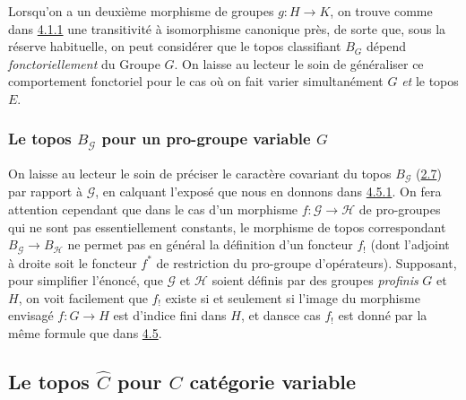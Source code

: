 \documentclass[10pt]{../fichiers-configuration-latex/smfart}
\begin{document}
Lorsqu'on a un deuxième morphisme de groupes $g:H\rightarrow K$,
on trouve comme dans \hyperref[IV.subsubsec4.1.1]{4.1.1} une transitivité à
isomorphisme canonique près, de sorte que, sous la réserve
habituelle, on peut considérer que le topos classifiant $B_G$
dépend \emph{fonctoriellement} du Groupe $G$. On laisse au lecteur
le soin de généraliser ce comportement fonctoriel pour le cas où
on fait varier simultanément $G$ \emph{et} le topos $E$.

\subsubsection{Le topos $B_{𝒢}$ pour un pro-groupe variable
  $G$}

On laisse au lecteur le soin de préciser le caractère covariant
du topos $B_{𝒢}$ (\hyperref[IV.subsec2.7]{2.7}) par rapport à
$𝒢$, en calquant l'exposé que nous en donnons dans
\hyperref[IV.subsubsec4.5.1]{4.5.1}. On fera attention cependant que dans le cas
d'un morphisme $f:𝒢\rightarrow ℋ$ de pro-groupes qui
ne sont pas essentiellement constants, le morphisme de topos
correspondant $B_{𝒢}\rightarrow B_{ℋ}$ ne permet pas
en général la définition d'un foncteur $f_{!}$ (dont l'adjoint
à droite soit le foncteur $f^{\ast}$ de restriction du pro-groupe
d'opérateurs). Supposant, pour simplifier l'énoncé, que
$𝒢$ et $ℋ$ soient définis par des groupes
\emph{profinis} $G$ et $H$, on voit facilement que $f_{!}$ existe si
et seulement si l'image du morphisme envisagé $f:G\rightarrow H$
est d'indice fini dans $H$, et  dans\pageoriginale ce cas $f_{!}$
est donné par la même formule que dans \hyperref[IV.subsec4.5]{4.5}.

\subsection{Le topos $\widehat{C}$ pour $C$ catégorie variable}
\end{document}
